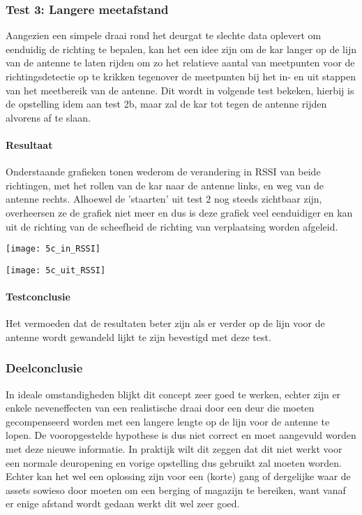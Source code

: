 \subsubsection{Test 3: Langere meetafstand}
Aangezien een simpele draai rond het deurgat te slechte data oplevert om eenduidig de richting te bepalen, kan het een idee zijn om de kar langer op de lijn van de antenne te laten rijden om zo het relatieve aantal van meetpunten voor de richtingsdetectie op te krikken tegenover de meetpunten bij het in- en uit stappen van het meetbereik van de antenne. Dit wordt in volgende test bekeken, hierbij is de opstelling idem aan test 2b, maar zal de kar tot tegen de antenne rijden alvorens af te slaan.

\paragraph{Resultaat}
Onderstaande grafieken tonen wederom de verandering in RSSI van beide richtingen, met het rollen van de kar naar de antenne links, en weg van de antenne rechts. Alhoewel de 'staarten' uit test 2 nog steeds zichtbaar zijn, overheersen ze de grafiek niet meer en dus is deze grafiek veel eenduidiger en kan uit de richting van de scheefheid de richting van verplaatsing worden afgeleid.

\begin{minipage}{0.42\textwidth}
	\texttt{[image: 5c\_in\_RSSI]}
\end{minipage}
\hfill
\begin{minipage}{0.42\textwidth}
	\texttt{[image: 5c\_uit\_RSSI]}
\end{minipage}

\paragraph{Testconclusie}
Het vermoeden dat de resultaten beter zijn als er verder op de lijn voor de antenne wordt gewandeld lijkt te zijn bevestigd met deze test.

\subsubsection{Deelconclusie}
In ideale omstandigheden blijkt dit concept zeer goed te werken, echter zijn er enkele neveneffecten van een realistische draai door een deur die moeten gecompenseerd worden met een langere lengte op de lijn voor de antenne te lopen. De vooropgestelde hypothese is dus niet correct en moet aangevuld worden met deze nieuwe informatie. In praktijk wilt dit zeggen dat dit niet werkt voor een normale deuropening en vorige opstelling dus gebruikt zal moeten worden. Echter kan het wel een oplossing zijn voor een (korte) gang of dergelijke waar de assets sowieso door moeten om een berging of magazijn te bereiken, want vanaf er enige afstand wordt gedaan werkt dit wel zeer goed. 

